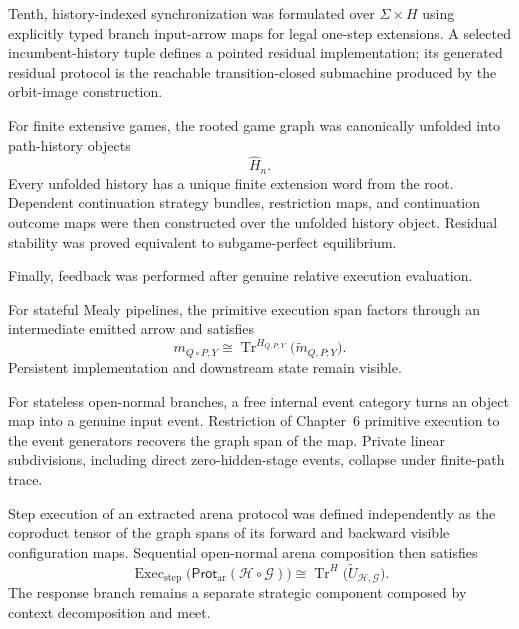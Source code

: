 Tenth, history-indexed synchronization was formulated over \(\Sigma\times H\) using explicitly typed
branch input-arrow maps for legal one-step extensions. A selected incumbent-history tuple defines a
pointed residual implementation; its generated residual protocol is the reachable transition-closed
submachine produced by the orbit-image construction.

For finite extensive games, the rooted game graph was canonically unfolded into path-history objects
\[
  \widehat H_n.
\]
Every unfolded history has a unique finite extension word from the root. Dependent continuation
strategy bundles, restriction maps, and continuation outcome maps were then constructed over the
unfolded history object. Residual stability was proved equivalent to subgame-perfect equilibrium.

Finally, feedback was performed after genuine relative execution evaluation.

For stateful Mealy pipelines, the primitive execution span factors through an intermediate emitted
arrow and satisfies
\[
  \boxed{
  m_{Q\circ P,Y}
  \cong
  \operatorname{Tr}^{H_{Q,P;Y}}
  \bigl(
    \widetilde m_{Q,P;Y}
  \bigr).
  }
\]
Persistent implementation and downstream state remain visible.

For stateless open-normal branches, a free internal event category turns an object map into a genuine
input event. Restriction of Chapter~6 primitive execution to the event generators recovers the graph
span of the map. Private linear subdivisions, including direct zero-hidden-stage events, collapse
under finite-path trace.

Step execution of an extracted arena protocol was defined independently as the coproduct tensor of
the graph spans of its forward and backward visible configuration maps. Sequential open-normal arena
composition then satisfies
\[
  \boxed{
  \operatorname{Exec}_{\mathrm{step}}
  \bigl(
    \mathsf{Prot}_{\mathrm{ar}}
    (\mathcal H\circ\mathcal G)
  \bigr)
  \cong
  \operatorname{Tr}^{H}
  \bigl(
    \widetilde U_{\mathcal H,\mathcal G}
  \bigr).
  }
\]
The response branch remains a separate strategic component composed by context decomposition and
meet.